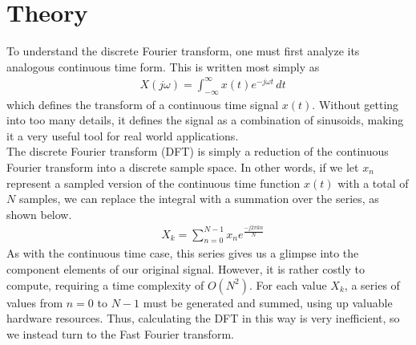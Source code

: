 \documentclass[12pt]{article}
\begin{document}
  \section*{Theory}
    To understand the discrete Fourier transform, one must first analyze its analogous continuous    time form.
    This is written most simply as
    \begin{align*}
    &X(j\omega) = \int_{-\infty}^{\infty} x(t) e^{-j \omega t}\,dt
    \end{align*}
    which defines the transform of a continuous time signal $x(t)$.
    Without getting into too many details, it defines the signal as a combination of sinusoids,      making it a very useful tool for real world applications.\\

    The discrete Fourier transform (DFT) is simply a reduction of the continuous Fourier transform   into a discrete sample space.
    In other words, if we let $x_n$ represent a sampled version of the continuous time function      $x(t)$ with a total of $N$ samples, we can replace the integral with a summation over the series, as shown below.
    \begin{align*}
        &X_k = \sum\limits_{n=0}^{N-1} x_n e^{\frac{-j2\pi kn}{N}}
    \end{align*}
    As with the continuous time case, this series gives us a glimpse into the component elements of  our original signal.
    However, it is rather costly to compute, requiring a time complexity of $O(N^2)$.
    For each value $X_k$, a series of values from $n = 0$ to $N - 1$ must be generated and summed,   using up valuable hardware resources.
    Thus, calculating the DFT in this way is very inefficient, so we instead turn to the Fast  Fourier transform.\\
\end{document}
